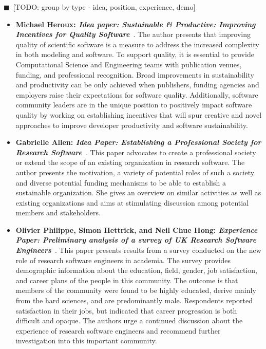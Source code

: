 \documentclass[11pt, oneside]{amsart}
\newcommand{\todo}[1]{{\color{blue}$\blacksquare$~\textsf{[TODO: #1]}}}
\begin{document}
\todo{group by type - idea, position, experience, demo}
\begin{itemize}
\item \textbf{Michael Heroux: \emph{Idea paper: Sustainable \& Productive:
Improving Incentives for Quality Software}}~\cite{Heroux:2016ws}.
The author presents that improving quality of scientific software is a measure
to address the increased complexity in both modeling and software. To support
quality, it is essential to provide Computational Science and Engineering teams
with publication venues, funding, and  professional recognition. Broad
improvements in sustainability and productivity can be only achieved when
publishers, funding agencies and employers raise their expectations for
software quality. Additionally, software community leaders are in the unique
position to positively impact software quality by working on establishing
incentives that will spur creative and novel approaches to improve developer
productivity  and software sustainability.

\item \textbf{Gabrielle Allen: \emph{Idea Paper: Establishing a Professional
Society for Research Software}}~\cite{GAllen:2016ws}.
This paper advocates to create a professional society or extend the scope of an
existing organization in research software. The author presents the motivation,
a variety of potential roles of such a society and diverse potential funding
mechanisms to be able to establish a sustainable organization. She gives an
overview on similar activities as well as existing organizations and aims at
stimulating discussion among potential members and stakeholders.

\item \textbf{Olivier Philippe, Simon Hettrick, and Neil Chue Hong:
\emph{Experience Paper: Preliminary analysis of a survey of UK Research
Software Engineers}}~\cite{Philippe:2016ws}.
This paper presents results from a survey conducted on the new role of research
software engineers in academia. The survey provides demographic information
about the education, field, gender, job satisfaction, and career plans of the people
in this community. The outcome is that members of the community  were found to be
highly educated, derive mainly from the hard sciences, and are predominantly male.
Respondents reported satisfaction in their jobs, but indicated that career progression
is both difficult and opaque. The authors urge a continued discussion about the experience
of research software engineers and recommend further investigation into this
important community.


\end{itemize}
\end{document}
